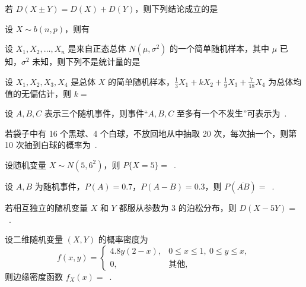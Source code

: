 \documentclass{../template/cqutest}
\begin{document}
\newpage
\begin{examquestions}[resume]
  \item 若 $D(X\pm Y)=D(X)+D(Y)$，则下列结论成立的是\choiceanswer{}

  \item 设 $X\sim b(n,p)$，则有\choiceanswer{}

  \item 设 $X_1,X_2,\ldots,X_n$ 是来自正态总体 $N(\mu,\sigma^2)$ 的一个简单随机样本，其中 $\mu$ 已知，$\sigma^2$ 未知，则下列不是统计量的是\choiceanswer{}

  \item 设 $X_1,X_2,X_3,X_4$ 是总体 $X$ 的简单随机样本，$\frac13X_1+kX_2+\frac19X_3+\frac7{18}X_4$ 为总体均值的无偏估计，则 $k=$\choiceanswer{}
\end{examquestions}

\begin{examquestions}[resume]
  \item 设 $A,B,C$ 表示三个随机事件，则事件“$A,B,C$ 至多有一个不发生”可表示为\ \answer[38mm]{}.
  \item 若袋子中有 16 个黑球、4 个白球，不放回地从中抽取 20 次，每次抽一个，则第 10 次抽到白球的概率为\ \answer[26mm]{}.
  \item 设随机变量 $X\sim N(5,6^2)$，则 $P\{X=5\}=$\ \answer[26mm]{}.
  \item 设 $A,B$ 为随机事件，$P(A)=0.7$，$P(A-B)=0.3$，则 $P(\overline{AB})=$\ \answer[26mm]{}.
  \item 若相互独立的随机变量 $X$ 和 $Y$ 都服从参数为 3 的泊松分布，则 $D(X-5Y)=$\ \answer[26mm]{}.
  \item 设二维随机变量 $(X,Y)$ 的概率密度为
  \[
    f(x,y)=\begin{cases}4.8y(2-x),&0\le x\le1,\ 0\le y\le x,\\0,&\text{其他},\end{cases}
  \]
  则边缘密度函数 $f_X(x)=$\ \answer[35mm]{}.
\end{examquestions}
\end{document}
